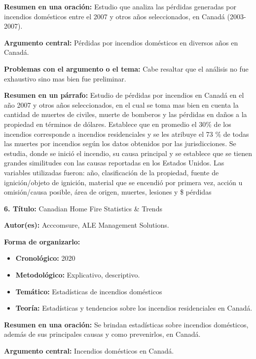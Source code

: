 \documentclass[
  oneside]{memoir}
\begin{document}
\textbf{Resumen en una oración:} Estudio que analiza las pérdidas
generadas por incendios domésticos entre el 2007 y otros años
seleccionados, en Canadá (2003-2007).

\textbf{Argumento central:} Pérdidas por incendios domésticos en
diversos años en Canadá.

\textbf{Problemas con el argumento o el tema:} Cabe resaltar que el
análisis no fue exhaustivo sino mas bien fue preliminar.

\textbf{Resumen en un párrafo:} Estudio de pérdidas por incendios en
Canadá en el año 2007 y otros años seleccionados, en el cual se toma mas
bien en cuenta la cantidad de muertes de civiles, muerte de bomberos y
las pérdidas en daños a la propiedad en términos de dólares. Establece
que en promedio el 30\% de los incendios corresponde a incendios
residenciales y se les atribuye el 73 \% de todas las muertes por
incendios según los datos obtenidos por las jurisdicciones. Se estudia,
donde se inició el incendio, su causa principal y se establece que se
tienen grandes similitudes con las causas reportadas en los Estados
Unidos. Las variables utilizadas fueron: año, clasificación de la
propiedad, fuente de ignición/objeto de ignición, material que se
encendió por primera vez, acción u omisión/causa posible, área de
origen, muertes, lesiones y \$ pérdidas

\textbf{ 6. Título:} Canadian Home Fire Statistics \& Trends

\textbf{Autor(es):} Acccomsure, ALE Management Solutions.

\textbf{Forma de organizarlo:}

\begin{itemize}

\item \textbf{Cronológico:} 2020

\item \textbf{Metodológico:} Explicativo, descriptivo.

\item \textbf{Temático:} Estadísticas de incendios domésticos

\item \textbf{Teoría:} Estadísticas y tendencios sobre los incendios residenciales en Canadá.
\end{itemize}

\textbf{Resumen en una oración:} Se brindan estadísticas sobre incendios
domésticos, además de sus principales causas y como prevenirlos, en
Canadá.

\textbf{Argumento central:} Incendios domésticos en Canadá.
\end{document}
